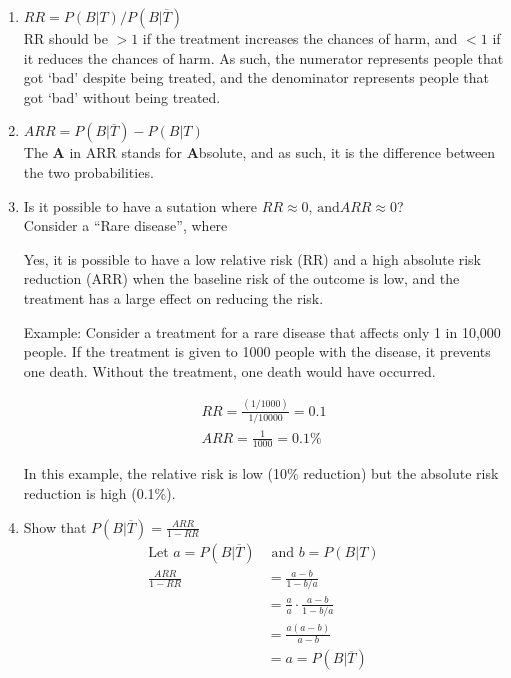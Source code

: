 \documentclass{article}
\begin{document}
\begin{enumerate}[label=\alph*)]
    \item \(RR = P(B \vert T) / P(B \vert \overline{T})\) \\
          RR should be \(> 1\) if the treatment increases the chances of harm, and \(< 1\) if it reduces the chances of harm.
          As such, the numerator represents people that got `bad' despite being treated, and the denominator represents people that got `bad' without being treated.
    \item \(ARR = P(B \vert \overline{T}) - P(B \vert T)\) \\
          The \textbf{A} in ARR stands for \textbf{A}bsolute, and as such, it is the difference between the two probabilities.
    \item Is it possible to have a sutation where \(RR \approx 0 \text{, and} ARR \approx 0\)? \\
          Consider a ``Rare disease'', where

          Yes, it is possible to have a low relative risk (RR) and a high absolute risk reduction (ARR) when the baseline risk of the outcome is low, and the treatment has a large effect on reducing the risk.

          Example: Consider a treatment for a rare disease that affects only 1 in 10,000 people. If the treatment is given to 1000 people with the disease, it prevents one death. Without the treatment, one death would have occurred.

          \begin{align*}
              RR = \frac{(1/1000)}{1/10000} = 0.1 \\
              ARR = \frac{1}{1000} = 0.1\%
          \end{align*}

          In this example, the relative risk is low (10\% reduction) but the absolute risk reduction is high (0.1\%).

    \item Show that \(P(B \vert \overline{T}) = \frac{ARR}{1-RR}\)
          \begin{align*}
              \text{Let } a = P(B \vert \overline{T}) & \text{ and } b = P(B \vert T)           \\
              \frac{
                  ARR
              }{
                  1-RR
              }                                       & = \frac{a - b}{ 1 - b/a}                \\
                                                      & = \frac{a}{a} \cdot \frac{a-b}{1 - b/a} \\
                                                      & = \frac{a(a-b)}{a-b}                    \\
                                                      & = a =P(B \vert \overline{T})
          \end{align*}
\end{enumerate}
\end{document}
